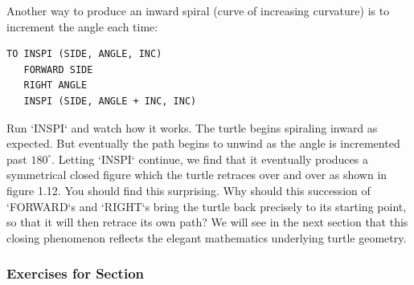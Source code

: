 \documentclass{book}
\begin{document}
Another way to produce an inward spiral (curve of increasing curvature) is to increment the angle each time:

\begin{verbatim}
TO INSPI (SIDE, ANGLE, INC)
   FORWARD SIDE
   RIGHT ANGLE
   INSPI (SIDE, ANGLE + INC, INC)
\end{verbatim}
Run \textsc{`INSPI`} and watch how it works. The turtle begins spiraling
inward as expected. But eventually the path begins to unwind as the
angle is incremented past $180^{\circ}$. Letting \textsc{`INSPI`} continue, we 
find that it eventually produces a symmetrical closed figure which the turtle 
retraces over and over as shown in figure 1.12. You should find this surprising.
Why should this succession of \textsc{`FORWARD`}s and \textsc{`RIGHT`}s bring the 
turtle back precisely to its starting point, so that it will then retrace its own path?
We will see in the next section that this closing phenomenon reflects the
elegant mathematics underlying turtle geometry.

\subsubsection{Exercises for Section \thesection}
\end{document}
